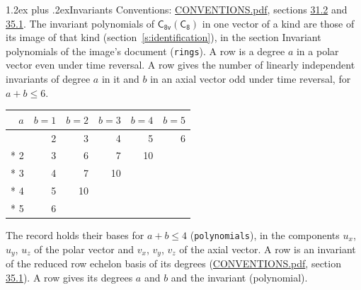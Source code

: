 \documentclass[10pt,a4paper]{article}
\makeatletter
\renewcommand\section{\@startsection{section}{1}{\z@}{-3ex plus -1ex minus -.2ex}%
  {1.2ex plus .2ex}{\normalfont\large\sffamily\bfseries\color{parttitle}}}
\numberwithin{equation}{section}
\newcommand{\grp}[1]{\mathsf{#1}}
\makeatother
\begin{document}
\section{Invariants}\label{s:invariants}
Conventions: \href{../../CONVENTIONS.pdf}{CONVENTIONS.pdf}, sections \href{../../CONVENTIONS.pdf\#conv.31.2}{31.2} and \href{../../CONVENTIONS.pdf\#conv.35.1}{35.1}.
The invariant polynomials of $\grp{C_{8v}}(\grp{C_{8}})$ in one vector of a kind are those of its image of that kind (section~\ref{s:identification}), in the section Invariant polynomials of the image's document (\texttt{rings}).
\leavevmode\label{n:index.degree.polar}\label{n:index.degree.axial}A row is a degree $a$ in a polar vector even under time reversal. A row gives the number of linearly independent invariants of degree $a$ in it and $b$ in an axial vector odd under time reversal, for $a + b \le 6$.
{\small\begin{longtable}{@{}rrrrrr@{}}\toprule
$a$ & $b = 1$ & $b = 2$ & $b = 3$ & $b = 4$ & $b = 5$\\\midrule\endhead
\bottomrule\endfoot\endlastfoot
1 & 2 & 3 & 4 & 5 & 6\\*
2 & 3 & 6 & 7 & 10 & \\*
3 & 4 & 7 & 10 &  & \\*
4 & 5 & 10 &  &  & \\*
5 & 6 &  &  &  & \\
\bottomrule\end{longtable}}
\leavevmode\label{n:local.component.polar}\label{n:local.component.axial}The record holds their bases for $a + b \le 4$ (\texttt{polynomials}), in the components $u_{x}$, $u_{y}$, $u_{z}$ of the polar vector and $v_{x}$, $v_{y}$, $v_{z}$ of the axial vector. \label{n:head.polynomial}A row is an invariant of the reduced row echelon basis of its degrees (\href{../../CONVENTIONS.pdf}{CONVENTIONS.pdf}, section \href{../../CONVENTIONS.pdf\#conv.35.1}{35.1}). A row gives its degrees $a$ and $b$ and the invariant (polynomial).
\end{document}

